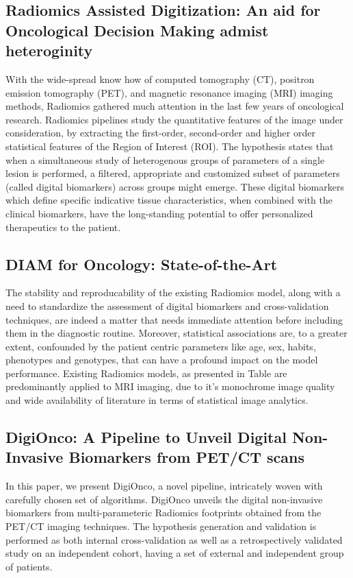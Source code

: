 \documentclass[10pt,journal,compsoc]{IEEEtran}
\begin{document}
\subsection{Radiomics Assisted Digitization: An aid for Oncological Decision Making admist heteroginity}

With the wide-spread know how of computed tomography (CT), positron emission tomography (PET), and magnetic resonance imaging (MRI) imaging methods, Radiomics gathered much attention in the last few years of oncological research. Radiomics pipelines study the quantitative features of the image under consideration, by extracting the first-order, second-order and higher order statistical features of the Region of Interest (ROI). The hypothesis states that when a simultaneous study of heterogenous groups of parameters of a single lesion is performed, a filtered, appropriate and customized subset of parameters (called digital biomarkers) across groups might emerge. These digital biomarkers which define specific indicative tissue characteristics, when combined with the clinical biomarkers, have the long-standing potential to offer personalized therapeutics to the patient.

\subsection{DIAM for Oncology: State-of-the-Art}
The stability and reproducability of the existing Radiomics model, along with a need to standardize the assessment of digital biomarkers and cross-validation techniques, are indeed a matter that needs immediate attention before including them in the diagnostic routine. Moreover, statistical associations are, to a greater extent, confounded by the patient centric parameters like age, sex, habits, phenotypes and genotypes, that can have a profound impact on the model performance. Existing Radiomics models, as presented in Table are predominantly applied to MRI imaging, due to it's monochrome image quality and wide availability of literature in terms of statistical image analytics.

\subsection{DigiOnco: A Pipeline to Unveil Digital Non-Invasive Biomarkers from PET/CT scans}

In this paper, we present DigiOnco, a novel pipeline, intricately woven with carefully chosen set of algorithms. DigiOnco unveils the digital non-invasive biomarkers from multi-parameteric Radiomics footprints obtained from the PET/CT imaging techniques. The hypothesis generation and validation is performed as both internal cross-validation as well as a retrospectively validated study on an independent cohort, having a set of external and independent group of patients.
\end{document}
